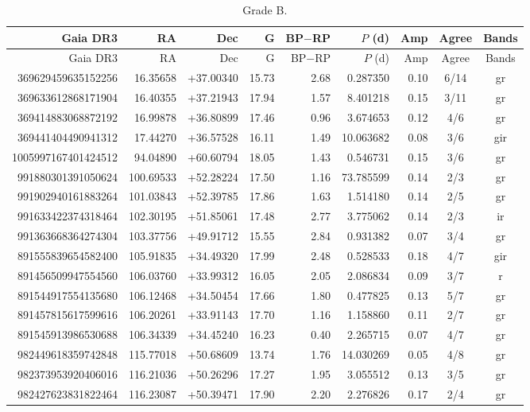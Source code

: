 \documentclass[11pt]{article}
\begin{document}
{\small\setlength{\tabcolsep}{3.5pt}
\begin{longtable}{rrrrrrrcc}
\caption{Grade B.}\\
\toprule Gaia DR3 & RA & Dec & G & BP$-$RP & $P$ (d) & Amp & Agree & Bands\\\midrule\endfirsthead
\toprule Gaia DR3 & RA & Dec & G & BP$-$RP & $P$ (d) & Amp & Agree & Bands\\\midrule\endhead
369629459635152256 & 16.35658 & +37.00340 & 15.73 & 2.68 & 0.287350 & 0.10 & 6/14 & gr \\
369633612868171904 & 16.40355 & +37.21943 & 17.94 & 1.57 & 8.401218 & 0.15 & 3/11 & gr \\
369414883068872192 & 16.99878 & +36.80899 & 17.46 & 0.96 & 3.674653 & 0.12 & 4/6 & gr \\
369441404490941312 & 17.44270 & +36.57528 & 16.11 & 1.49 & 10.063682 & 0.08 & 3/6 & gir \\
1005997167401424512 & 94.04890 & +60.60794 & 18.05 & 1.43 & 0.546731 & 0.15 & 3/6 & gr \\
991880301391050624 & 100.69533 & +52.28224 & 17.50 & 1.16 & 73.785599 & 0.14 & 2/3 & gr \\
991902940161883264 & 101.03843 & +52.39785 & 17.86 & 1.63 & 1.514180 & 0.14 & 2/5 & gr \\
991633422374318464 & 102.30195 & +51.85061 & 17.48 & 2.77 & 3.775062 & 0.14 & 2/3 & ir \\
991363668364274304 & 103.37756 & +49.91712 & 15.55 & 2.84 & 0.931382 & 0.07 & 3/4 & gr \\
891555839654582400 & 105.91835 & +34.49320 & 17.99 & 2.48 & 0.528533 & 0.18 & 4/7 & gir \\
891456509947554560 & 106.03760 & +33.99312 & 16.05 & 2.05 & 2.086834 & 0.09 & 3/7 & r \\
891544917554135680 & 106.12468 & +34.50454 & 17.66 & 1.80 & 0.477825 & 0.13 & 5/7 & gr \\
891457815617599616 & 106.20261 & +33.91143 & 17.70 & 1.16 & 1.158860 & 0.11 & 2/7 & gr \\
891545913986530688 & 106.34339 & +34.45240 & 16.23 & 0.40 & 2.265715 & 0.07 & 4/7 & gr \\
982449618359742848 & 115.77018 & +50.68609 & 13.74 & 1.76 & 14.030269 & 0.05 & 4/8 & gr \\
982373953920406016 & 116.21036 & +50.26296 & 17.27 & 1.95 & 3.055512 & 0.13 & 3/5 & gr \\
982427623831822464 & 116.23087 & +50.39471 & 17.90 & 2.20 & 2.276826 & 0.17 & 2/4 & gr \\

\end{longtable}}
\end{document}
